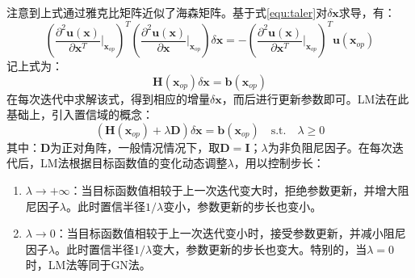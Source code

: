 注意到上式通过雅克比矩阵近似了海森矩阵。基于式\ref{equ:taler}对$\delta\boldsymbol{x}$求导，有：
\begin{equation}
  \left( \frac{\partial^2 \boldsymbol{u}(\boldsymbol{x})}{\partial \boldsymbol{x}^T}\bigg|_{\boldsymbol{x}_{op}}\right)^T
  \left( \frac{\partial^2 \boldsymbol{u}(\boldsymbol{x})}{\partial \boldsymbol{x}}\bigg|_{\boldsymbol{x}_{op}}\right)\delta\boldsymbol{x}=-\left( \frac{\partial^2 \boldsymbol{u}(\boldsymbol{x})}{\partial \boldsymbol{x}^T}\bigg|_{\boldsymbol{x}_{op}}\right)^T\boldsymbol{u}(\boldsymbol{x}_{op})
\end{equation}
记上式为：
\begin{equation}
  \boldsymbol{H}(\boldsymbol{x}_{op})\delta\boldsymbol{x}=\boldsymbol{b}(\boldsymbol{x}_{op})
\end{equation}
在每次迭代中求解该式，得到相应的增量$\delta\boldsymbol{x}$，而后进行更新参数即可。LM法在此基础上，引入置信域的概念：
\begin{equation}
  \left( \boldsymbol{H}(\boldsymbol{x}_{op}) +\lambda\boldsymbol{D}\right) \delta\boldsymbol{x}=\boldsymbol{b}(\boldsymbol{x}_{op})\quad \mathrm{s.t.}\quad\lambda\ge0
\end{equation}
其中：$\boldsymbol{D}$为正对角阵，一般情况情况下，取$\boldsymbol{D}=\boldsymbol{I}$；$\lambda$为非负阻尼因子。在每次迭代后，LM法根据目标函数值的变化动态调整$\lambda$，用以控制步长：
\begin{enumerate}
  \item $\lambda\to+\infty$：当目标函数值相较于上一次迭代变大时，拒绝参数更新，并增大阻尼因子$\lambda$。此时置信半径$1/\lambda$变小，参数更新的步长也变小。

  \item $\lambda\to 0$：当目标函数值相较于上一次迭代变小时，接受参数更新，并减小阻尼因子$\lambda$。此时置信半径$1/\lambda$变大，参数更新的步长也变大。特别的，当$\lambda=0$时，LM法等同于GN法。
\end{enumerate}

